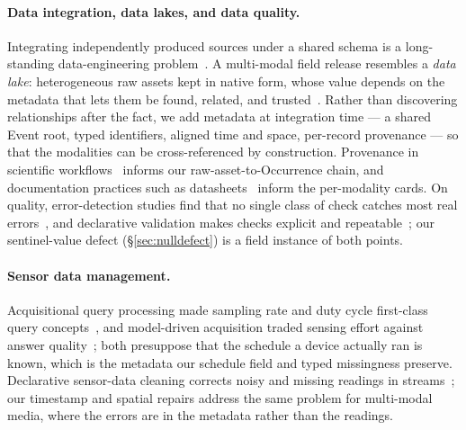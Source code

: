 \documentclass[sigconf]{acmart}
\begin{document}
\paragraph{Data integration, data lakes, and data quality.}
Integrating independently produced sources under a shared schema is a
long-standing data-engineering problem~\cite{halevy2006teenage}. A
multi-modal field release resembles a \emph{data lake}: heterogeneous
raw assets kept in native form, whose value depends on the metadata that
lets them be found, related, and trusted~\cite{nargesian2019datalake}.
Rather than discovering relationships after the fact, we add metadata at integration time --- a shared Event
root, typed identifiers, aligned time and space, per-record provenance
--- so that the modalities can be cross-referenced by construction.
Provenance in scientific workflows~\cite{simmhan2005provenance} informs
our raw-asset-to-Occurrence chain, and documentation practices such as
datasheets~\cite{gebru2021datasheets} inform the per-modality cards. On
quality, error-detection studies find that no single class of check
catches most real errors~\cite{abedjan2016detecting}, and declarative
validation makes checks explicit and repeatable~\cite{schelter2018deequ};
our sentinel-value defect (\S\ref{sec:nulldefect}) is a field instance of
both points.

\paragraph{Sensor data management.}
Acquisitional query processing made sampling rate and duty cycle
first-class query concepts~\cite{madden2005tinydb}, and model-driven
acquisition traded sensing effort against answer
quality~\cite{deshpande2004model}; both presuppose that the schedule a
device actually ran is known, which is the metadata our schedule field
and typed missingness preserve. Declarative sensor-data cleaning
corrects noisy and missing readings in
streams~\cite{jeffery2006declarative}; our timestamp and spatial repairs
address the same problem for multi-modal media, where the errors are in
the metadata rather than the readings.
\end{document}
